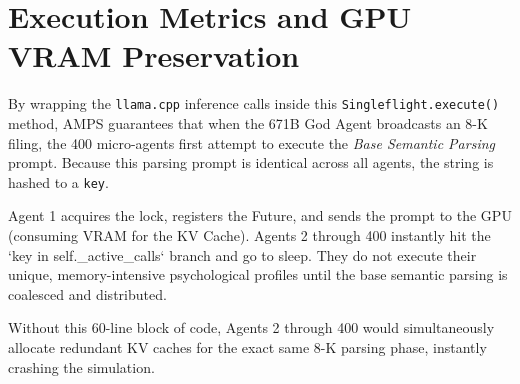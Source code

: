 \section{Execution Metrics and GPU VRAM Preservation}

By wrapping the \texttt{llama.cpp} inference calls inside this \texttt{Singleflight.execute()} method, AMPS guarantees that when the 671B God Agent broadcasts an 8-K filing, the 400 micro-agents first attempt to execute the \textit{Base Semantic Parsing} prompt. Because this parsing prompt is identical across all agents, the string is hashed to a \texttt{key}. 

Agent 1 acquires the lock, registers the Future, and sends the prompt to the GPU (consuming VRAM for the KV Cache). Agents 2 through 400 instantly hit the `key in self.\_active\_calls` branch and go to sleep. They do not execute their unique, memory-intensive psychological profiles until the base semantic parsing is coalesced and distributed. 

Without this 60-line block of code, Agents 2 through 400 would simultaneously allocate redundant KV caches for the exact same 8-K parsing phase, instantly crashing the simulation.

